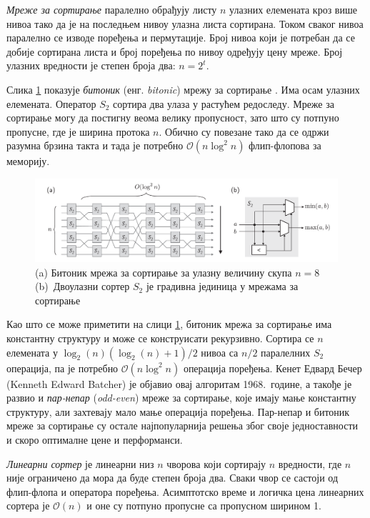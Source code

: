 \documentclass[12pt, a4paper]{article}
\theoremstyle{definition}
\begin{document}
\textit{Мреже за сортирање} паралелно обрађују листу $n$ улазних елемената кроз више нивоа тако да је на последњем нивоу улазна листа сортирана. Током сваког нивоа паралелно се изводе поређења и пермутације. Број нивоа који је потребан да се добије сортирана листа и број поређења по нивоу одређују цену мреже. Број улазних вредности је степен броја два: $n = 2^t$.

Слика \ref{fig:bitonicStages} показује \textit{битоник} (енг. \textit{bitonic}) мрежу за сортирање \cite{bitonicBatcher}. Има осам улазних елемената. Оператор $S_2$ сортира два улаза у растућем редоследу. Мреже за сортирање могу да постигну веома велику пропусност, зато што су потпуно пропусне, где је ширина протока $n$. Обично су повезане тако да се одржи разумна брзина такта и тада је потребно $\mathcal{O}(n \log^2 n)$ флип-флопова за меморију.
\begin{figure}[H]
  \centering
      \includegraphics[scale=0.24]{slike/bitonicStages.png}
  \caption{(a) Битоник мрежа за сортирање за улазну величину скупа $n = 8$ \mbox{(b) Двоулазни} сортер $S_2$ је градивна јединица у мрежама за сортирање}
  \label{fig:bitonicStages}
\end{figure}
Као што се може приметити на слици \ref{fig:bitonicStages}, битоник мрежа за сортирање има константну структуру и може се конструисати рекурзивно. Сортира се $n$ елемената у $\log_{2}(n)(\log_{2}(n)+1)/2$ нивоа са $n/2$ паралелних $S_2$ операција, па је потребно $\mathcal{O}(n\log^2 n)$ операција поређења. Кенет Едвард Бечер (Kenneth Edward Batcher) је објавио овај алгоритам 1968.\ године, а такође је развио и \textit{пар-непар} (\textit{odd-even}) мреже за сортирање, које имају мање константну структуру, али захтевају мало мање операција поређења.
Пар-непар и битоник мреже за сортирање су остале најпопуларнија решења због своје једноставности и скоро оптималне цене и перформанси.

\textit{Линеарни сортер} је линеарни низ $n$ чворова који сортирају $n$ вредности, где $n$ није ограничено да мора да буде степен броја два. Сваки чвор се састоји од флип-флопа и оператора поређења. Асимптотско време и логичка цена линеарних сортера је $\mathcal{O}(n)$ и оне су потпуно пропусне са пропусном ширином 1.
\end{document}

